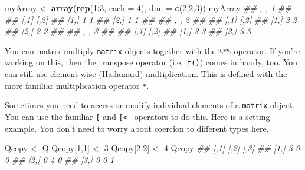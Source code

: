 \documentclass[12pt,krantz2]{krantz}
\makeatletter
\newenvironment{Shaded}{\begin{snugshade}}{\end{snugshade}}
\newcommand{\CommentTok}[1]{\textcolor[rgb]{0.37,0.37,0.37}{\textit{#1}}}
\newcommand{\DataTypeTok}[1]{\textcolor[rgb]{0.27,0.27,0.27}{#1}}
\newcommand{\DecValTok}[1]{\textcolor[rgb]{0.06,0.06,0.06}{#1}}
\newcommand{\KeywordTok}[1]{\textcolor[rgb]{0.27,0.27,0.27}{\textbf{#1}}}
\newcommand{\NormalTok}[1]{#1}
\newcommand{\OperatorTok}[1]{\textcolor[rgb]{0.43,0.43,0.43}{\textbf{#1}}}
\newcommand{\StringTok}[1]{\textcolor[rgb]{0.5,0.5,0.5}{#1}}
\newenvironment{kframe}{%
\medskip{}
\setlength{\fboxsep}{.8em}
 \def\at@end@of@kframe{}%
 \ifinner\ifhmode%
  \def\at@end@of@kframe{\end{minipage}}%
  \begin{minipage}{\columnwidth}%
 \fi\fi%
 \def\FrameCommand##1{\hskip\@totalleftmargin \hskip-\fboxsep
 \colorbox{shadecolor}{##1}\hskip-\fboxsep
     \hskip-\linewidth \hskip-\@totalleftmargin \hskip\columnwidth}%
 \MakeFramed {\advance\hsize-\width
   \@totalleftmargin\z@ \linewidth\hsize
   \@setminipage}}%
 {\par\unskip\endMakeFramed%
 \at@end@of@kframe}
\renewenvironment{Shaded}{\begin{kframe}}{\end{kframe}}
\makeatother
\begin{document}
\begin{Shaded}
\begin{Highlighting}[]
\NormalTok{myArray <-}\StringTok{ }\KeywordTok{array}\NormalTok{(}\KeywordTok{rep}\NormalTok{(}\DecValTok{1}\OperatorTok{:}\DecValTok{3}\NormalTok{, }\DataTypeTok{each =} \DecValTok{4}\NormalTok{), }\DataTypeTok{dim =} \KeywordTok{c}\NormalTok{(}\DecValTok{2}\NormalTok{,}\DecValTok{2}\NormalTok{,}\DecValTok{3}\NormalTok{))}
\NormalTok{myArray}
\CommentTok{## , , 1}
\CommentTok{## }
\CommentTok{##      [,1] [,2]}
\CommentTok{## [1,]    1    1}
\CommentTok{## [2,]    1    1}
\CommentTok{## }
\CommentTok{## , , 2}
\CommentTok{## }
\CommentTok{##      [,1] [,2]}
\CommentTok{## [1,]    2    2}
\CommentTok{## [2,]    2    2}
\CommentTok{## }
\CommentTok{## , , 3}
\CommentTok{## }
\CommentTok{##      [,1] [,2]}
\CommentTok{## [1,]    3    3}
\CommentTok{## [2,]    3    3}
\end{Highlighting}
\end{Shaded}

You can matrix-multiply \texttt{matrix} objects together with the \texttt{\%*\%} operator. If you're working on this, then the transpose operator (i.e.~\texttt{t()}) comes in handy, too. You can still use element-wise (Hadamard) multiplication. This is defined with the more familiar multiplication operator \texttt{*}.

\begin{Shaded}
\end{Shaded}

Sometimes you need to access or modify individual elements of a \texttt{matrix} object. You can use the familiar \texttt{{[}} and \texttt{{[}\textless{}-} operators to do this. Here is a setting example. You don't need to worry about coercion to different types here.

\begin{Shaded}
\begin{Highlighting}[]
\NormalTok{Qcopy <-}\StringTok{ }\NormalTok{Q}
\NormalTok{Qcopy[}\DecValTok{1}\NormalTok{,}\DecValTok{1}\NormalTok{] <-}\StringTok{ }\DecValTok{3}
\NormalTok{Qcopy[}\DecValTok{2}\NormalTok{,}\DecValTok{2}\NormalTok{] <-}\StringTok{ }\DecValTok{4}
\NormalTok{Qcopy}
\CommentTok{##      [,1] [,2] [,3]}
\CommentTok{## [1,]    3    0    0}
\CommentTok{## [2,]    0    4    0}
\CommentTok{## [3,]    0    0    1}
\end{Highlighting}
\end{Shaded}
\end{document}

